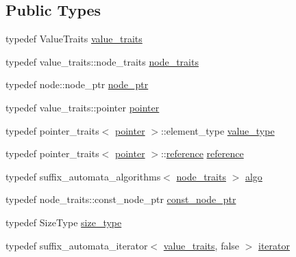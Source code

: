 \subsection*{Public Types}
\begin{DoxyCompactItemize}
\item 
typedef Value\+Traits \hyperlink{classboost_1_1intrusive_1_1suffix__automata__impl_abbf3dee8caf18613db903931801c6076}{value\+\_\+traits}
\item 
typedef value\+\_\+traits\+::node\+\_\+traits \hyperlink{classboost_1_1intrusive_1_1suffix__automata__impl_a3bf4d50a1aa7e13e6d6ded62d04a0296}{node\+\_\+traits}
\item 
typedef node\+::node\+\_\+ptr \hyperlink{classboost_1_1intrusive_1_1suffix__automata__impl_ab2d4128c7fc9c5ba87fa9eb5d50c318a}{node\+\_\+ptr}
\item 
typedef value\+\_\+traits\+::pointer \hyperlink{classboost_1_1intrusive_1_1suffix__automata__impl_aa30039fa797b95a84660985ab506f6ef}{pointer}
\item 
typedef pointer\+\_\+traits$<$ \hyperlink{classboost_1_1intrusive_1_1suffix__automata__impl_aa30039fa797b95a84660985ab506f6ef}{pointer} $>$\+::element\+\_\+type \hyperlink{classboost_1_1intrusive_1_1suffix__automata__impl_afc35e3e13adbae16ac9bfb049d719cd2}{value\+\_\+type}
\item 
typedef pointer\+\_\+traits$<$ \hyperlink{classboost_1_1intrusive_1_1suffix__automata__impl_aa30039fa797b95a84660985ab506f6ef}{pointer} $>$\+::\hyperlink{classboost_1_1intrusive_1_1suffix__automata__impl_a65352a440751b963521c55774953f0e4}{reference} \hyperlink{classboost_1_1intrusive_1_1suffix__automata__impl_a65352a440751b963521c55774953f0e4}{reference}
\item 
typedef suffix\+\_\+automata\+\_\+algorithms$<$ \hyperlink{classboost_1_1intrusive_1_1suffix__automata__impl_a3bf4d50a1aa7e13e6d6ded62d04a0296}{node\+\_\+traits} $>$ \hyperlink{classboost_1_1intrusive_1_1suffix__automata__impl_afa6f98d48851586ded5a3141789336d7}{algo}
\item 
typedef node\+\_\+traits\+::const\+\_\+node\+\_\+ptr \hyperlink{classboost_1_1intrusive_1_1suffix__automata__impl_acf5340d09b102d7fa183bcb304e96d0b}{const\+\_\+node\+\_\+ptr}
\item 
typedef Size\+Type \hyperlink{classboost_1_1intrusive_1_1suffix__automata__impl_ad2fe9bd542f914c94c7d0e42cce5613c}{size\+\_\+type}
\item 
typedef suffix\+\_\+automata\+\_\+iterator$<$ \hyperlink{classboost_1_1intrusive_1_1suffix__automata__impl_abbf3dee8caf18613db903931801c6076}{value\+\_\+traits}, false $>$ \hyperlink{classboost_1_1intrusive_1_1suffix__automata__impl_af7c03e2d35758eb2040a589cc35cc36c}{iterator}

\end{DoxyCompactItemize}
